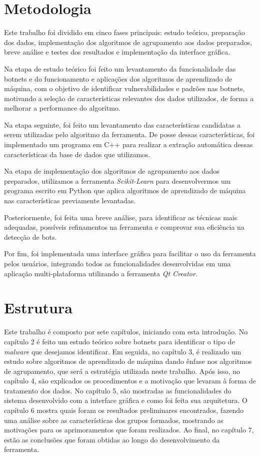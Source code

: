 \section{Metodologia}
Este trabalho foi dividido em cinco fases principais: estudo teórico, preparação dos dados, implementação dos algoritmos de agrupamento aos dados preparados, breve análise e testes dos resultados e implementação da interface gráfica. 

Na etapa de estudo teórico foi feito um levantamento da funcionalidade das botnets e do funcionamento e aplicações dos algoritmos de aprendizado de máquina, com o objetivo de identificar vulnerabilidades e padrões nas botnets, motivando a seleção de características relevantes dos dados utilizados, de forma a melhorar a performance do algoritmo.

Na etapa seguinte, foi feito um levantamento das características candidatas a serem utilizadas pelo algoritmo da ferramenta. De posse dessas características, foi implementado um programa em C++ para realizar a extração automática dessas características da base de dados que utilizamos.

Na etapa de implementação dos algoritmos de agrupamento aos dados preparados, utilizamos a ferramenta \textit{Scikit-Learn} para desenvolvermos um programa escrito em Python que aplica algoritmos de aprendizado de máquina nas características previamente levantadas.

Posteriormente, foi feita uma breve análise, para identificar as técnicas mais adequadas, possíveis refinamentos na ferramenta e comprovar sua eficiência na detecção de bots.

Por fim, foi implementada uma interface gráfica para facilitar o uso da ferramenta pelos usuários, integrando todos as funcionalidades desenvolvidas em uma aplicação multi-plataforma utilizando a ferramenta \textit{Qt Creator}.

\section{Estrutura}
Este trabalho é composto por sete capítulos, iniciando com esta introdução. No capítulo 2 é feito um estudo teórico sobre botnets para identificar o tipo de \textit{malware} que desejamos identificar. Em seguida, no capítulo 3, é realizado um estudo sobre algoritmos de aprendizado de máquina dando ênfase nos algoritmos de agrupamento, que será a estratégia utilizada neste trabalho. Após isso, no capítulo 4, são explicados os procedimentos e a motivação que levaram à forma de tratamento dos dados. No capítulo 5, são mostradas as funcionalidades do sistema desenvolvido com a interface gráfica e como foi feita sua arquitetura. O capítulo 6 mostra quais foram os resultados preliminares encontrados, fazendo uma análise sobre as características dos grupos formados, mostrando as motivações para os aprimoramentos que foram realizados. Ao final, no capítulo 7, estão as conclusões que foram obtidas ao longo do desenvolvimento da ferramenta.